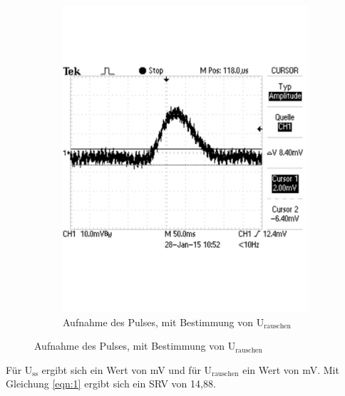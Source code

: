 \documentclass[12pt,a4paper]{article}
\begin{document}
\begin{figure}[H]
\begin{subfigure}[b]{0.45\textwidth}
   \includegraphics[trim = 0mm 50mm 0mm 50mm, clip, scale = 0.4]{a2_rauschen.pdf}
  \caption[Aufnahme des Pulses, mit Bestimmung von U$_\text{rauschen}$]{Aufnahme des Pulses, mit Bestimmung von U$_\text{rauschen}$} 
  \label{fig:u_rauschen}
\end{subfigure}
\label{fig:srv}
\end{figure}

Für U$_\text{ss}$ ergibt sich ein Wert von \unit[32,4]{mV} und für U$_\text{rauschen}$ ein Wert von \unit[8,4]{mV}. Mit Gleichung \ref{eqn:1} ergibt sich ein SRV von 14,88.
\end{document}
